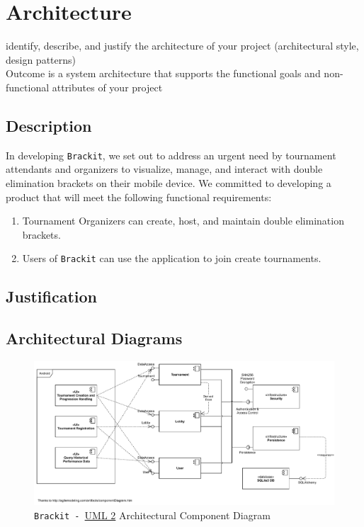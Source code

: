 \documentclass{article}
\begin{document}
\section{Architecture}
identify, describe, and justify the architecture of your project (architectural style, design patterns) \\
Outcome is a system architecture that supports the functional goals and non-functional attributes of your project 
\subsection{Description}
In developing \texttt{Brackit}, we set out to address an urgent need by tournament attendants and organizers to visualize, manage, and interact with double elimination
brackets on their mobile device. We committed to developing a product that will meet the following functional requirements:
\begin{enumerate}
    \item{Tournament Organizers can create, host, and maintain double elimination brackets.}
    \item{Users of \texttt{Brackit} can use the application to join create tournaments.}
    
\end{enumerate}
\subsection{Justification}
\clearpage
\subsection{Architectural Diagrams}
\vfill
\begin{center}
    \begin{figure}[htp]
        \centering
        \includegraphics[width=18cm]{../diagrams/component_diag.pdf}
        \caption{\texttt{Brackit - }\href{https://sparxsystems.com/resources/tutorials/uml2/index.html}{UML 2} Architectural Component Diagram}
        \end{figure}
\end{center}
\vfill
\end{document}
